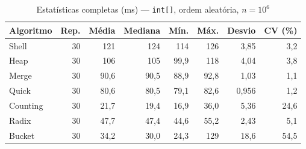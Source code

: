 \begin{table}[htbp]\centering\small
\caption{Estatísticas completas (ms) — \texttt{int[]}, ordem aleatória, $n = 10^6$}\label{tab:det-int-1M}
\begin{tabular}{lrrrrrrr}
\toprule
Algoritmo & Rep. & Média & Mediana & Mín. & Máx. & Desvio & CV (\%) \\
\midrule
Shell & 30 & 121 & 124 & 114 & 126 & 3,85 & 3,2 \\
Heap & 30 & 106 & 105 & 99,9 & 118 & 4,04 & 3,8 \\
Merge & 30 & 90,6 & 90,5 & 88,9 & 92,8 & 1,03 & 1,1 \\
Quick & 30 & 80,6 & 80,5 & 79,1 & 82,6 & 0,956 & 1,2 \\
Counting & 30 & 21,7 & 19,4 & 16,9 & 36,0 & 5,36 & 24,6 \\
Radix & 30 & 47,7 & 47,4 & 44,6 & 55,2 & 2,43 & 5,1 \\
Bucket & 30 & 34,2 & 30,0 & 24,3 & 129 & 18,6 & 54,5 \\
\bottomrule
\end{tabular}
\end{table}